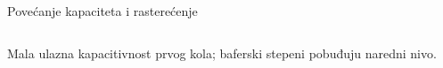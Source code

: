 \begin{frame}[label=09_3-s024]{Povećanje kapaciteta i rasterećenje}
\begin{columns}[c,onlytextwidth]
\begin{center}

\end{center}
\begin{center}

\end{center}
\end{columns}\medskip Mala ulazna kapacitivnost prvog kola; baferski stepeni pobuđuju naredni nivo.
\end{frame}
